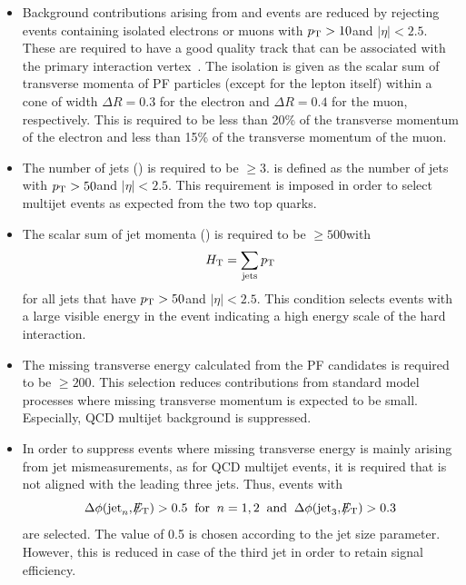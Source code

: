 \begin{itemize}
 \item{Background contributions arising from \ttbar and \WJets events are reduced by rejecting events containing isolated electrons or muons with $p_{\text{T}} > 10$\gev and $|\eta| < 2.5$. These are required to have a good quality track that can be associated with the primary interaction vertex~\cite{CMS-PAS-EGM-10-004, CMS-PAS-MUO-10-002}. The isolation is given as the scalar sum of transverse momenta of PF particles (except for the lepton itself) within a cone of width $\Delta R = 0.3$ for the electron and $\Delta R = 0.4$ for the muon, respectively. This is required to be less than 20\% of the transverse momentum of the electron and less than 15\% of the transverse momentum of the muon.}
 \item{The number of jets (\NJets) is required to be $\ge 3$. \NJets is defined as the number of jets with $p_{\text{T}} > 50$\gev and $|\eta| < 2.5$. This requirement is imposed in order to select multijet events as expected from the two top quarks.}
 \item{The scalar sum of jet momenta (\HT) is required to be $\ge 500$\gev with 
\begin{equation*}
H_{\text{T}} = \sum_{\mathrm{jets}} p_{\text{T}} 
\end{equation*}
for all jets that have $p_{\text{T}} > 50$\gev and $|\eta| < 2.5$. This condition selects events with a large visible energy in the event indicating a high energy scale of the hard interaction.}   
 \item{The missing transverse energy \met calculated from the PF candidates is required to be $\ge 200$\gev. This selection reduces contributions from standard model processes where missing transverse momentum is expected to be small. Especially, QCD multijet background is suppressed. } 
 \item{In order to suppress events where missing transverse energy is mainly arising from jet mismeasurements, as for QCD multijet events, it is required that \met is not aligned with the leading three jets. Thus, events with
\begin{equation*}
\Delta \phi(\mathrm{jet}_n, \slash\mkern-12mu{E}_{\text{T}}) > 0.5 \;\; \mathrm{for} \;\; n = 1,2 \;\; \mathrm{and} \;\; \Delta \phi(\mathrm{jet}_3, \slash\mkern-12mu{E}_{\text{T}}) > 0.3
\end{equation*} 
are selected. The value of 0.5 is chosen according to the jet size parameter. However, this is reduced in case of the third jet in order to retain signal efficiency. }
\end{itemize}
